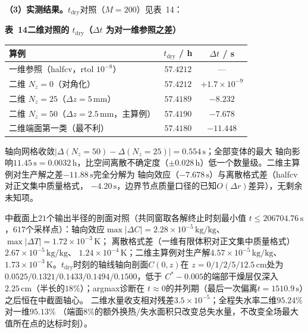 \documentclass[withoutpreface,bwprint]{cumcmthesis} %
\begin{document}
\begin{appendices}
\textbf{（3）实测结果。}$t_{\mathrm{dry}}$对照（$M=200$）见表~14：

\begin{table}[htbp]
\centering
\begin{minipage}{0.94\textwidth}
\centering\small
\textbf{表~14\quad 二维对照的 $t_{\mathrm{dry}}$（$\Delta t$ 为对一维参照之差）}\\[3pt]
\begin{tabular}{lcc}
\toprule
算例 & $t_{\mathrm{dry}}$ / h & $\Delta t$ / s \\
\midrule
一维参照（halfcv，rtol $10^{-8}$） & $57.4212$ & — \\
二维 $N_z=0$（对角化） & $57.4212$ & $+1.7\times10^{-9}$ \\
二维 $N_z=25$（$\Delta z=5\,\mathrm{mm}$） & $57.4189$ & $-8.232$ \\
二维 $N_z=50$（$\Delta z=2.5\,\mathrm{mm}$，主算例） & $57.4190$ & $\mathbf{-7.678}$ \\
二维端面第一类（最不利） & $57.4180$ & $-11.448$ \\
\bottomrule
\end{tabular}
\end{minipage}
\end{table}

轴向网格收敛$|\Delta(N_z{=}50)-\Delta(N_z{=}25)|=0.554\,\mathrm{s}$；全部变体的最大
轴向影响$11.45\,\mathrm{s}=0.0032\,\mathrm{h}$，比空间离散不确定度（$\pm0.028\,
\mathrm{h}$）低一个数量级。二维主算例对生产解之差$-11.88\,\mathrm{s}$完全分解为
轴向效应（$-7.678\,\mathrm{s}$）与离散格式差（halfcv对正文集中质量格式，
$-4.20\,\mathrm{s}$，边界节点质量口径的已知$O(\Delta r)$差异），无剩余未知项。

中截面上$21$个输出半径的剖面对照（共同窗取各解终止时刻最小值
$t\le206704.76\,\mathrm{s}$，$617$个采样点）：轴向效应$\max|\Delta C|
=2.28\times10^{-5}\,\mathrm{kg/kg}$、$\max|\Delta T|=1.72\times10^{-3}\,\mathrm{K}$；
离散格式差（一维有限体积对正文集中质量格式）$2.67\times10^{-5}\,\mathrm{kg/kg}$、
$1.24\times10^{-4}\,\mathrm{K}$；二维主算例对生产解$4.57\times10^{-5}\,\mathrm{kg/kg}$、
$1.73\times10^{-3}\,\mathrm{K}$。$t_{\mathrm{dry}}$时刻的轴线轴向剖面$C(0,z)$在
$z=0/1/2/5/12.5\,\mathrm{cm}$处为$0.0525/0.1321/0.1433/0.1494/0.1500$，低于
$C^*-0.005$的端部干燥层仅深入$2.25\,\mathrm{cm}$（半长的$18\%$）；argmax诊断在
$t\approx0$的并列期（最后一次偏离$t=1510.9\,\mathrm{s}$）之后恒在中截面轴心。
二维水量收支相对残差$3.5\times10^{-5}$；全程失水率二维$95.24\%$对一维$95.13\%$
（端面$8\%$的额外换热/失水面积只改变总失水量，不改变全场最大值所在点的达标时刻）。


\end{appendices}
\end{document}
